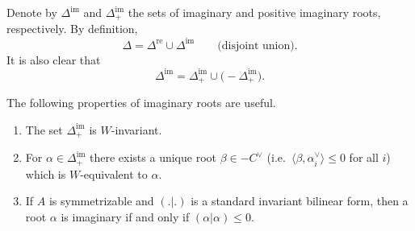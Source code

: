 \documentclass[12pt]{article}
\begin{document}
Denote by
$\Delta^{\mathrm{im}}$ and $\Delta^{\mathrm{im}}_+$ the sets of imaginary and
positive imaginary roots, respectively. By definition,
\[
    \Delta = \Delta^{\mathrm{re}} \cup \Delta^{\mathrm{im}}
    \qquad \text{(disjoint union).}
\]
It is also clear that
\[
    \Delta^{\mathrm{im}} = \Delta^{\mathrm{im}}_+ \cup \big(-\Delta^{\mathrm{im}}_+\big).
\]

The following properties of imaginary roots are useful.

\begin{proposition}\label{prop:imaginary-roots}
    \leavevmode
    \begin{enumerate}[label=\alph*)]
        \item The set $\Delta^{\mathrm{im}}_+$ is $W$-invariant.
        \item For $\alpha \in \Delta^{\mathrm{im}}_+$ there exists a unique root
              $\beta \in -C^\vee$ (i.e.\ $\langle \beta, \alpha_i^\vee \rangle \leq 0$
              for all $i$) which is $W$-equivalent to $\alpha$.
        \item If $A$ is symmetrizable and $(.|.)$ is a standard invariant bilinear
              form, then a root $\alpha$ is imaginary if and only if $(\alpha|\alpha)\leq 0$.
    \end{enumerate}
\end{proposition}
\end{document}
